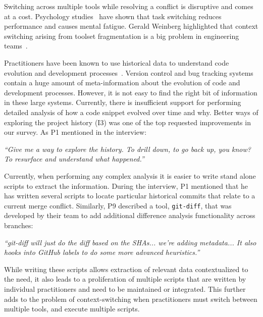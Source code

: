 Switching across multiple tools while resolving a conflict is disruptive and comes at a cost. Psychology studies~\cite{Meiran2000}\cite{gopher2000switching} have shown that task switching reduces performance and causes mental fatigue. 
Gerald Weinberg highlighted that context switching arising from toolset fragmentation is a big problem in engineering teams~\cite{Weinberg1992}. 


Practitioners have been known to use historical data to understand code evolution and development processes~\cite{Mihai_lenses}.
Version control and bug tracking systems contain a huge amount of meta-information about the evolution of code and development processes.
However, it is not easy to find the right bit of information in these large systems. 
Currently, there is insufficient support for performing detailed analysis of how a code snippet evolved over time and why. 
Better ways of exploring the project history (I3) was one of the top requested improvements in our survey. 
As P1 mentioned in the interview:
\begin{quoting}
\textit{``Give me a way to explore the history. To drill down, to go back up, you know? To resurface and understand what happened.''}
\end{quoting}


Currently, when performing any complex analysis it is easier to write stand alone scripts to extract the information. 
During the interview, P1 mentioned that he has written several scripts to locate particular historical commits that relate to a current merge conflict. 
Similarly, P9 described a tool, \texttt{git-diff}, that was developed by their team to add additional difference analysis functionality across branches:
\begin{quoting}
\textit{``git-diff will just do the diff based on the SHAs... we're adding metadata... It also hooks into GitHub labels to do some more advanced heuristics.''}
\end{quoting}

While writing these scripts allows extraction of relevant data contextualized to the need, it also leads to a proliferation of multiple scripts that are written by individual practitioners and need to be maintained or integrated.
This further adds to the problem of context-switching when practitioners must switch between multiple tools, and execute multiple scripts.

